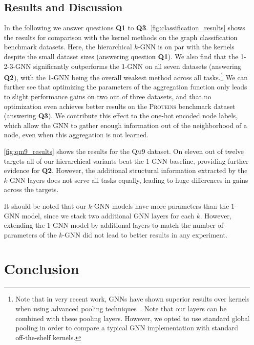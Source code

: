 \documentclass[letterpaper]{article}
\theoremstyle{definition}
\begin{document}
\subsection{Results and Discussion}

In the following we answer questions \textbf {Q1} to \textbf{Q3}. \cref{fig:classification_results} shows the results for comparison with the kernel methods on the graph classification benchmark datasets. Here, the hierarchical $k$-GNN is on par with the kernels despite the small dataset sizes (answering question \textbf{Q1}).
We also find that the 1-2-3-GNN significantly outperforms the 1-GNN on all seven datasets (answering \textbf{Q2}), with the 1-GNN being the overall weakest method across all tasks.\footnote{Note that in very recent work, GNNs have shown superior results over kernels when using advanced pooling techniques~\cite{Yin+2018}. Note that our layers can be combined with these pooling layers. However, we opted to use standard global pooling in order to compare a typical GNN implementation with standard off-the-shelf kernels.}
We can further see that optimizing the parameters of the aggregation function only leads to slight performance gains on two out of three datasets, and that no optimization even achieves better results on the \textsc{Proteins} benchmark dataset (answering \textbf{Q3}).
We contribute this effect to the one-hot encoded node labels, which allow the GNN to gather enough information out of the neighborhood of a node, even when this aggregation is not learned.

\cref{fig:qm9_results} shows the results for the \textsc{Qm9} dataset. On eleven out of twelve targets all of our hierarchical variants beat the $1$-GNN baseline, providing further evidence for \textbf{Q2}. 
However, the additional structural information extracted by the $k$-GNN layers does not serve all tasks equally, leading to huge differences in gains across the targets.

It should be noted that our $k$-GNN models have more parameters than the $1$-GNN model, since we stack two additional GNN layers for each $k$. However, extending the $1$-GNN model by additional layers to match the number of parameters of the $k$-GNN did not lead to better results in any experiment.


\section{Conclusion}
\end{document}
